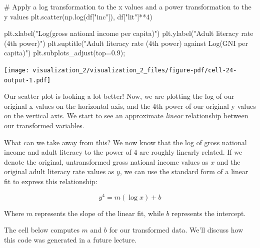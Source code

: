 \documentclass[
  letterpaper,
  DIV=11,
  numbers=noendperiod]{scrreprt}
\newenvironment{Shaded}{\begin{snugshade}}{\end{snugshade}}
\newcommand{\CommentTok}[1]{\textcolor[rgb]{0.37,0.37,0.37}{#1}}
\newcommand{\DecValTok}[1]{\textcolor[rgb]{0.68,0.00,0.00}{#1}}
\newcommand{\FloatTok}[1]{\textcolor[rgb]{0.68,0.00,0.00}{#1}}
\newcommand{\NormalTok}[1]{\textcolor[rgb]{0.00,0.23,0.31}{#1}}
\newcommand{\OperatorTok}[1]{\textcolor[rgb]{0.37,0.37,0.37}{#1}}
\newcommand{\StringTok}[1]{\textcolor[rgb]{0.13,0.47,0.30}{#1}}
\begin{document}
\begin{Shaded}
\begin{Highlighting}[]
\CommentTok{\# Apply a log transformation to the x values and a power transformation to the y values}
\NormalTok{plt.scatter(np.log(df[}\StringTok{"inc"}\NormalTok{]), df[}\StringTok{"lit"}\NormalTok{]}\OperatorTok{**}\DecValTok{4}\NormalTok{)}

\NormalTok{plt.xlabel(}\StringTok{"Log(gross national income per capita)"}\NormalTok{)}
\NormalTok{plt.ylabel(}\StringTok{"Adult literacy rate (4th power)"}\NormalTok{)}
\NormalTok{plt.suptitle(}\StringTok{"Adult literacy rate (4th power) against Log(GNI per capita)"}\NormalTok{)}
\NormalTok{plt.subplots\_adjust(top}\OperatorTok{=}\FloatTok{0.9}\NormalTok{)}\OperatorTok{;}
\end{Highlighting}
\end{Shaded}

\texttt{[image: visualization\_2/visualization\_2\_files/figure-pdf/cell-24-output-1.pdf]}

Our scatter plot is looking a lot better! Now, we are plotting the log
of our original x values on the horizontal axis, and the 4th power of
our original y values on the vertical axis. We start to see an
approximate \emph{linear} relationship between our transformed
variables.

What can we take away from this? We now know that the log of gross
national income and adult literacy to the power of 4 are roughly
linearly related. If we denote the original, untransformed gross
national income values as \(x\) and the original adult literacy rate
values as \(y\), we can use the standard form of a linear fit to express
this relationship:

\[y^4 = m(\log{x}) + b\]

Where \(m\) represents the slope of the linear fit, while \(b\)
represents the intercept.

The cell below computes \(m\) and \(b\) for our transformed data. We'll
discuss how this code was generated in a future lecture.
\end{document}
